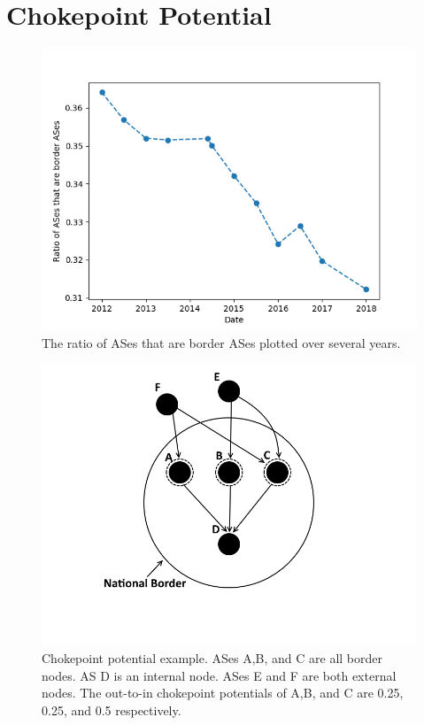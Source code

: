 \documentclass[10pt, conference, letterpaper]{IEEEtran}
\begin{document}
\section{Chokepoint Potential}


\begin{figure}
	\centering
	\includegraphics[width=\linewidth]{bnodes}
	\caption{The ratio of ASes that are border ASes plotted over several years.}\label{fig:bnodes}
\end{figure}

\begin{figure}
	\centering
	\includegraphics[width=\linewidth]{chokepoint}
	\caption{Chokepoint potential example. ASes A,B, and C are all border nodes. 
						AS D is an internal node. ASes E and F are both external nodes.
						The out-to-in chokepoint potentials of A,B, and C are 0.25, 0.25, and 0.5 respectively.}\label{fig:chokepoint}
\end{figure}
\end{document}
